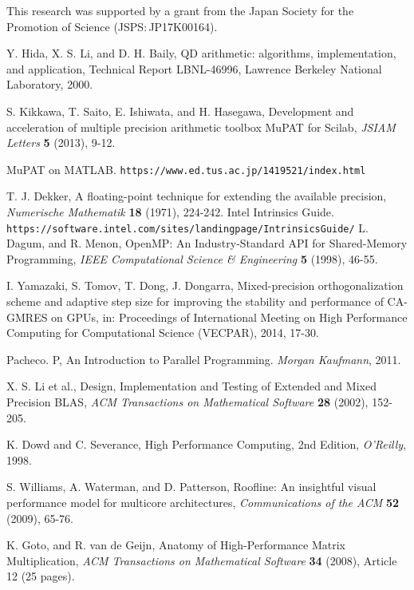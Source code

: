 \documentclass{IOS-Book-Article}
\begin{document}
This research was supported by a grant from the Japan Society for the Promotion of Science (JSPS$\colon$JP17K00164).
\begin{thebibliography}{99}
 Y. Hida, X. S. Li, and D. H. Baily, QD arithmetic: algorithms, implementation, and application, Technical Report LBNL-46996, Lawrence Berkeley National Laboratory, 2000.

 S. Kikkawa, T. Saito, E. Ishiwata, and H. Hasegawa, Development and acceleration of multiple precision arithmetic toolbox MuPAT for Scilab, {\it JSIAM Letters} {\bf 5} (2013), 9-12. 

 MuPAT on MATLAB. {\tt https://www.ed.tus.ac.jp/1419521/index.html}

 T. J. Dekker, A floating-point technique for extending the available precision, {\it Numerische Mathematik} {\bf 18} (1971), 224-242. 
 Intel Intrinsics Guide. {\tt https://software.intel.com/sites/landingpage/IntrinsicsGuide/}
 L. Dagum, and R. Menon, OpenMP: An Industry-Standard API for Shared-Memory Programming, {\it IEEE Computational Science \& Engineering} {\bf 5} (1998), 46-55. 

I. Yamazaki, S. Tomov, T. Dong, J. Dongarra, Mixed-precision orthogonalization scheme and adaptive step size for improving the stability and performance of CA-GMRES on GPUs, in: Proceedings of International Meeting on High Performance Computing for Computational Science (VECPAR), 2014, 17-30.

 Pacheco. P, An Introduction to Parallel Programming. {\it Morgan Kaufmann}, 2011.

 X. S. Li et al., Design, Implementation and Testing of Extended and Mixed Precision BLAS, {\it ACM Transactions on Mathematical Software} {\bf 28} (2002), 152-205.

 K. Dowd and C. Severance, High Performance Computing, 2nd Edition, {\it O'Reilly}, 1998.

 S. Williams, A. Waterman, and D. Patterson, Roofline: An insightful visual performance model for multicore architectures, {\it Communications of the ACM} {\bf 52} (2009),  65-76.

 K. Goto, and R. van de Geijn, Anatomy of High-Performance Matrix Multiplication, {\it ACM Transactions on Mathematical Software} {\bf 34} (2008), Article 12 (25 pages).

\end{thebibliography}
\end{document}
